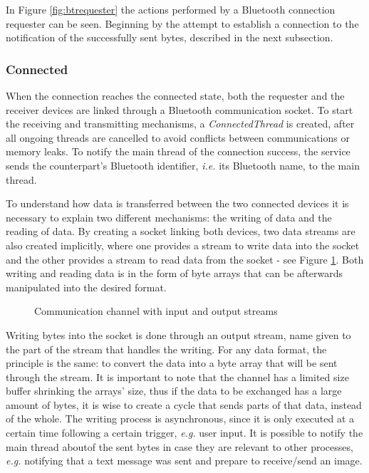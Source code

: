 In Figure \ref{fig:btrequester} the actions performed by a Bluetooth connection requester can be seen. Beginning by the attempt to establish a connection to the notification of the successfully sent bytes, described in the next subsection.

\subsubsection{Connected}
\label{subsubsec:connected}

When the connection reaches the connected state, both the requester and the receiver devices are linked through a Bluetooth communication socket. To start the receiving and transmitting mechanisms, a \textit{ConnectedThread} is created, after all ongoing threads are cancelled to avoid conflicts between communications or memory leaks. To notify the main thread of the connection success, the service sends the counterpart's Bluetooth identifier, \textit{i.e.} its Bluetooth name, to the main thread.

To understand how data is transferred between the two connected devices it is necessary to explain two different mechanisms: the writing of data and the reading of data. By creating a socket linking both devices, two data streams are also created implicitly, where one provides a stream to write data into the socket and the other provides a stream to read data from the socket - see Figure \ref{fig:inoutstreams}. Both writing and reading data is in the form of byte arrays that can be afterwards manipulated into the desired format.

\begin{figure}[ht]
	\noindent{}
	\caption{\label{fig:inoutstreams} Communication channel with input and output streams}
\end{figure}

Writing bytes into the socket is done through an output stream, name given to the part of the stream that handles the writing. For any data format, the principle is the same: to convert the data into a byte array that will be sent through the stream. It is important to note that the channel has a limited size buffer shrinking the arrays' size, thus if the data to be exchanged has a large amount of bytes, it is wise to create a cycle that sends parts of that data, instead of the whole. The writing process is asynchronous, since it is only executed at a certain time following a certain trigger, \textit{e.g.} user input. It is possible to notify the main thread aboutof the sent bytes in case they are relevant to other processes, \textit{e.g.} notifying that a text message was sent and prepare to receive/send an image.

